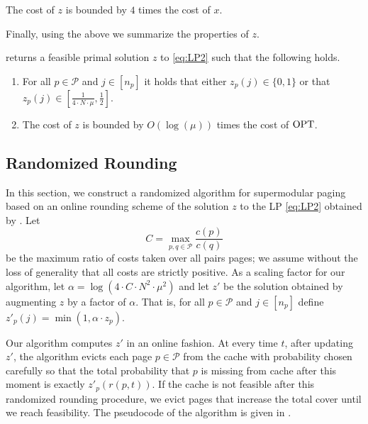 \documentclass[11pt]{article}
\newcommand{\comment}[1]{}
\newcommand{\cP}{{\mathcal{P}}}
\newcommand{\OPT}{\textnormal{OPT}}
\begin{document}
\begin{obs}
	\label{obs:z}
	The cost of $z$ is bounded by $4$ times the cost of $x$. 
\end{obs}

Finally, using the above we summarize the properties of $z$.

	\begin{lemma}
	\label{lem:ALGf}
	 returns a feasible primal solution $z$ to \eqref{eq:LP2} such that the following holds. 
	\begin{enumerate}
		\item For all $p \in \cP$ and $j \in [n_p]$ it holds that either $z_p(j) \in \{0,1\}$ or that $z_p(j) \in \left[\frac{1}{4 \cdot N \cdot \mu},\frac{1}{2}\right]$.
		\item The cost of $z$ is bounded by $O(\log (\mu))$ times the cost of $\OPT$. 
	\end{enumerate}
\end{lemma}

\comment{
\begin{proof}
	The feasibility of $z$ follows from \Cref{lem:zFeasible}. Moreover, the first property follows from \Cref{step:1/2,step:z} of the algorithm. For the second property, since $x$ and $y$ are feasible primal and dual solutions by \Cref{lem:primalX} and \Cref{lem:FFeasible}, it follows that the cost of $x$ is bounded by $O(\log (\mu))$ times the cost of $\OPT$. Thus, the proof follows from Observation~\ref{obs:z}.  
\end{proof}
}

\subsection{Randomized Rounding}

In this section, we construct a randomized algorithm for supermodular paging based on an online rounding scheme of the solution $z$ to the LP \eqref{eq:LP2} obtained by . Let $$C = \max_{p,q \in \cP} \frac{c(p)}{c(q)}$$ be the maximum ratio of costs taken over all pairs pages; we assume without the loss of generality that all costs are strictly positive. As a scaling factor for our algorithm, let $\alpha = \log \left(4 \cdot C \cdot N^2 \cdot \mu^2\right)$ and let $z'$ be the solution obtained by augmenting $z$ by a factor of $\alpha$. That is, for all $p \in \cP$ and $j \in [n_p]$ define $z'_p(j) = \min \left( 1, \alpha \cdot z_p \right)$.  

Our algorithm computes $z'$ in an online fashion. At every time $t$, after updating $z'$, the algorithm evicts each page $p \in \cP$ from the cache with probability chosen carefully so that the total probability that $p$ is missing from cache after this moment is exactly $z'_p(r(p,t))$. %
If the cache is not feasible after this randomized rounding procedure, we evict pages that increase the total cover until we reach feasibility. The pseudocode of the algorithm is given in . 
\end{document}
